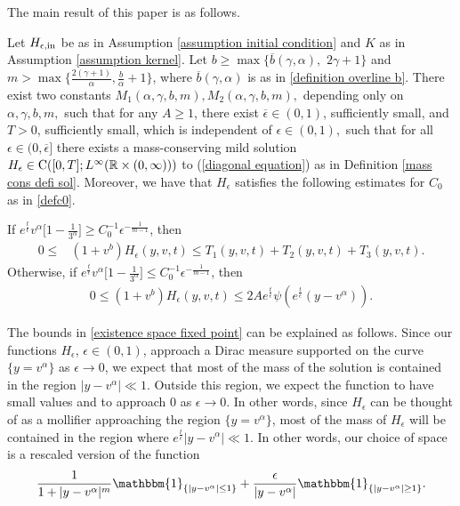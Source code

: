 \documentclass[11pt]{article}
\numberwithin{equation}{section}
\begin{document}
The main result of this paper is as follows.
\begin{teo}\label{proposition existence via fixed point}
   Let $H_{\epsilon,\textup{in}}$ be as in Assumption \ref{assumption initial condition} and $K$ as in Assumption \ref{assumption kernel}. Let $b\geq \max\{\overline{b}(\gamma,\alpha), $ $2\gamma+1\}$ and $m>\max\{\frac{2(\gamma+1)}{\alpha},\frac{b}{\alpha}+1\}$, where  $\overline{b}(\gamma,\alpha)$ is as in \eqref{definition overline b}. There exist two constants $M_{1}(\alpha,\gamma,b,m), M_{2}(\alpha,\gamma,b,m),$ depending only on $\alpha,\gamma,b,m,$ such that for any $A\geq 1$, there exist $\overline{\epsilon}\in(0,1)$, sufficiently small, and  $T>0$, sufficiently small, which is independent of $\epsilon\in(0,1),$ such that  for all $\epsilon\in(0,\overline{\epsilon}]$ there exists a mass-conserving mild solution $H_{\epsilon}\in\textup{C}([0,T];L^{\infty}(\mathbb{R}\times(0,\infty)))$ to (\ref{diagonal equation}) as in Definition \ref{mass cons defi sol}. Moreover, we have that $H_{\epsilon}$ satisfies the following estimates for $C_{0}$ as in \eqref{defc0}.
   
   If $e^{\frac{t}{\epsilon}}v^{\alpha}\big[1-\frac{1}{3^{\alpha}}\big]\geq  C_{0}^{-1}\epsilon^{-\frac{1}{m-1}} $, then
    \begin{align}\label{existence space fixed point}
   0\leq &(1+v^{b}) H_{\epsilon}(y,v,t)\leq  T_{1}(y,v,t)+T_{2}(y,v,t)+T_{3}(y,v,t).
    \end{align}
Otherwise, if  $e^{\frac{t}{\epsilon}}v^{\alpha}\big[1-\frac{1}{3^{\alpha}}\big]\leq  C_{0}^{-1}\epsilon^{-\frac{1}{m-1}} $, then
\begin{align}
   0\leq (1+v^{b}) H_{\epsilon}(y,v,t)\leq 2Ae^{\frac{t}{\epsilon}}\psi(e^{\frac{t}{\epsilon}}(y-v^{\alpha})).
    \end{align}
\end{teo}
The bounds in \eqref{existence space fixed point} can be explained as follows. Since our functions $H_{\epsilon}$, $\epsilon\in(0,1)$, approach a Dirac measure supported on the curve $\{y=v^{\alpha}\}$ as $\epsilon\rightarrow 0$, we expect that most of the mass of the solution is contained in the region $|y-v^{\alpha}|\ll 1$. Outside this region, we expect the function to have small values and to approach $0$ as $\epsilon\rightarrow 0$. In other words, since $H_{\epsilon}$ can be thought of as a mollifier approaching the region $\{y=v^{\alpha}\}$, most of the mass of $H_{\epsilon}$ will be contained in  the region where $e^{\frac{t}{\epsilon}}|y-v^{\alpha}|\ll 1$. In other words, our choice of space is a rescaled version of the function
\begin{align*}
\frac{1}{1+|y-v^{\alpha}|^{m}}\mathbbm{1}_{\{|y-v^{\alpha}|\leq 1\}}+\frac{\epsilon}{|y-v^{\alpha}|}\mathbbm{1}_{\{|y-v^{\alpha}|\geq 1\}}.
\end{align*}
\end{document}
